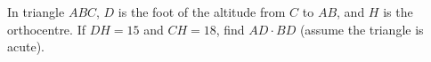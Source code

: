 In triangle $ABC$, $D$ is the foot of the altitude from $C$ to $AB$, and $H$ is the orthocentre. If $DH=15$ and $CH=18$, find $AD\cdot BD$ (assume the triangle is acute).
